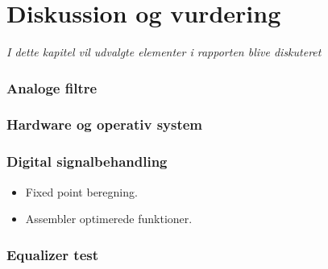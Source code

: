 
\chapter{Diskussion og vurdering}\label{kap:diskussion}
\emph{I dette kapitel vil udvalgte elementer i rapporten blive diskuteret}

\subsection{Analoge filtre}

\subsection{Hardware og operativ system}

\subsection{Digital signalbehandling}

\begin{itemize}
\item Fixed point beregning.
\item Assembler optimerede funktioner.
\end{itemize}
\subsection{Equalizer test}

